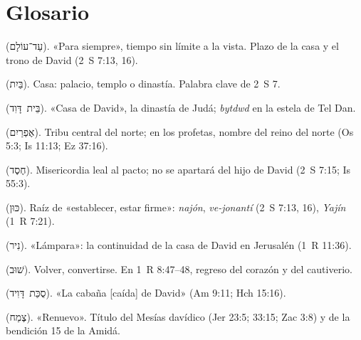 \documentclass[11pt,letterpaper]{article}
\newcommand{\heb}[1]{\mbox{\foreignlanguage{hebrew}{#1}}}
\begin{document}
\section*{Glosario}
\begin{description}\small
\item[Ad olam] (\heb{עַד־עוֹלָם}). «Para siempre», tiempo sin límite a la vista. Plazo de la casa y el trono de David (2~S 7:13, 16).
\item[Báyit] (\heb{בַּיִת}). Casa: palacio, templo o dinastía. Palabra clave de 2~S 7.
\item[Bet David] (\heb{בֵּית דָּוִד}). «Casa de David», la dinastía de Judá; \emph{bytdwd} en la estela de Tel Dan.
\item[Efraín] (\heb{אֶפְרַיִם}). Tribu central del norte; en los profetas, nombre del reino del norte (Os 5:3; Is 11:13; Ez 37:16).
\item[Jésed] (\heb{חֶסֶד}). Misericordia leal al pacto; no se apartará del hijo de David (2~S 7:15; Is 55:3).
\item[Kun] (\heb{כּוּן}). Raíz de «establecer, estar firme»: \emph{najón}, \emph{ve-jonantí} (2~S 7:13, 16), \emph{Yajín} (1~R 7:21).
\item[Nir] (\heb{נִיר}). «Lámpara»: la continuidad de la casa de David en Jerusalén (1~R 11:36).
\item[Shuv] (\heb{שׁוּב}). Volver, convertirse. En 1~R 8:47--48, regreso del corazón y del cautiverio.
\item[Sukkat David] (\heb{סֻכַּת דָּוִיד}). «La cabaña [caída] de David» (Am 9:11; Hch 15:16).
\item[Tsémaj] (\heb{צֶמַח}). «Renuevo». Título del Mesías davídico (Jer 23:5; 33:15; Zac 3:8) y de la bendición 15 de la Amidá.
\end{description}
\end{document}
